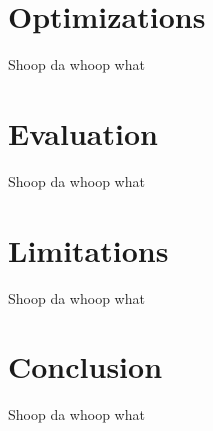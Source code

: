 \documentclass[mathserif,serif]{beamer}
\begin{document}
\section{Optimizations}
\begin{frame}{Shoop da whoop}
  what
\end{frame}

\section{Evaluation}
\begin{frame}{Shoop da whoop}
  what
\end{frame}

\section{Limitations}
\begin{frame}{Shoop da whoop}
  what
\end{frame}

\section{Conclusion}
\begin{frame}{Shoop da whoop}
  what
\end{frame}
\end{document}
